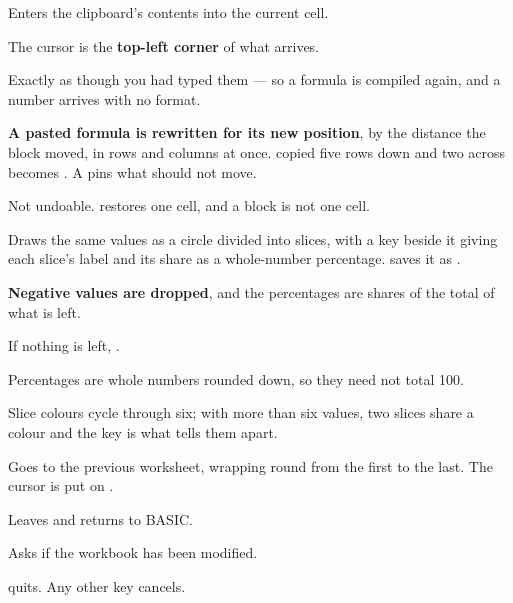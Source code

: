 
Enters the clipboard's contents into the current cell.

\begin{ccsteps}
\item The cursor is the \textbf{top-left corner} of what arrives.
\item Exactly as though you had typed them --- so a formula is compiled again,
and a number arrives with no format.
\item \textbf{A pasted formula is rewritten for its new position}, by the
distance the block moved, in rows and columns at once.  copied five
rows down and two across becomes . A \lit{\$} pins what should not
move.
\item Not undoable.  restores one cell, and a block is not one cell.
\end{ccsteps}


Draws the same values as a circle divided into slices, with a key beside it
giving each slice's label and its share as a whole-number percentage. 
saves it as .

\begin{ccsteps}
\item \textbf{Negative values are dropped}, and the percentages are shares of
the total of what is left.
\item If nothing is left, .
\item Percentages are whole numbers rounded down, so they need not total 100.
\item Slice colours cycle through six; with more than six values, two slices
share a colour and the key is what tells them apart.
\end{ccsteps}


Goes to the previous worksheet, wrapping round from the first to the last. The
cursor is put on .


Leaves \ccprod{} and returns to BASIC.

\begin{ccsteps}
\item Asks  if the workbook has been modified.
\item {} quits. Any other key cancels.
\end{ccsteps}

